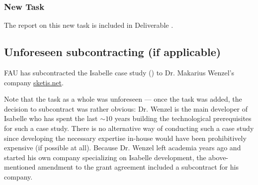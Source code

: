 \subsubsection{New Task }
The report on this new task is included in Deliverable .

\subsection{Unforeseen subcontracting (if applicable)}
FAU has subcontracted the Isabelle case study () to Dr. Makarius Wenzel's company \url{sketis.net}.

Note that the task as a whole was unforeseen --- once the task was added, the decision to subcontract was rather obvious:
Dr. Wenzel is the main developer of Isabelle who has spent the last $\sim 10$ years building the technological prerequisites for such a case study.
There is no alternative way of conducting such a case study since developing the necessary expertise in-house would have been prohibitively expensive (if possible at all).
Because Dr. Wenzel left academia years ago and started his own company
specializing on Isabelle development, the above-mentioned amendment to
the grant agreement included a subcontract for his company.



